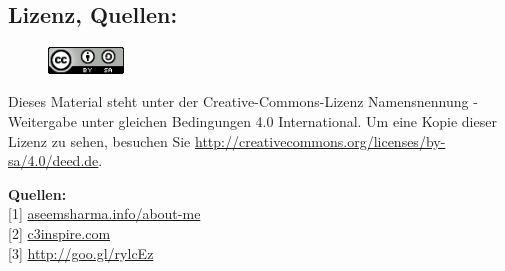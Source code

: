 \documentclass[10pt,a4paper,ngerman,twoside]{article} %
\newcommand{\SepRule}{\noindent	%
\begin{center}
\rule{250pt}{1pt} %
\end{center}
}
\begin{document}
\begin{multicols}{3}
\subsection*{Lizenz, Quellen:}
\begin{figure}
\includegraphics[width=2cm]{c3inspire/ccbysa88x31.png} 
\end{figure}
Dieses Material steht unter der Creative-Commons-Lizenz Namensnennung - Weitergabe unter gleichen Bedingungen 4.0 International. Um eine Kopie dieser Lizenz zu sehen, besuchen Sie \url{http://creativecommons.org/licenses/by-sa/4.0/deed.de}.

\textbf{Quellen:} \\
{[}1{]} \href{http://aseemsharma.info/about-me/aseemsharma/}{aseemsharma.info/about-me} \\
{[}2{]} \href{http://c3inspire.com}{c3inspire.com} \\
{[}3{]} \href{https://commons.wikimedia.org/wiki/User:TUBS}{http://goo.gl/rylcEz} 





\end{multicols}
\end{document}
